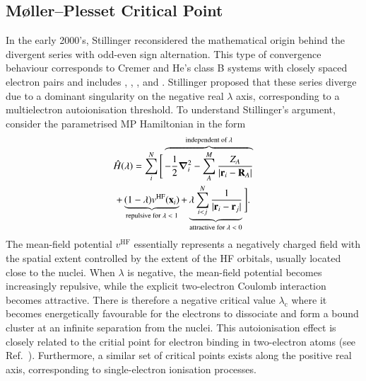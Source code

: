\documentclass[aps,prb,reprint,noshowkeys,linenumbers,superscriptaddress]{revtex4-1}
\newcommand{\Ne}{N} %
\newcommand{\Nn}{M} %
\newcommand{\hH}{\Hat{H}}
\newcommand{\lc}{\lambda_{\text{c}}}
\begin{document}
\subsection{M{\o}ller--Plesset Critical Point}
\label{sec:MP_critical_point}

In the early 2000's, Stillinger reconsidered the mathematical origin behind the divergent series with odd-even
sign alternation.\cite{Stillinger_2000} 
This type of convergence behaviour corresponds to Cremer and He's class B systems with closely spaced
electron pairs and includes , , , and .\cite{Cremer_1996}
Stillinger proposed that these series diverge due to a dominant singularity
on the negative real $\lambda$ axis, corresponding to a multielectron autoionisation threshold.\cite{Stillinger_2000}
To understand Stillinger's argument, consider the parametrised MP Hamiltonian in the form
\begin{multline}
\label{eq:HamiltonianStillinger}
    \hH(\lambda) = 
    \sum_{i}^{\Ne} \Bigg[ 
    \overbrace{-\frac{1}{2}\grad_i^2 
    - \sum_{A}^{\Nn} \frac{Z_A}{\abs{\vb{r}_i-\vb{R}_A}}}^{\text{independent of $\lambda$}}
    \\
    + \underbrace{(1-\lambda)v^{\text{HF}}(\vb{x}_i)}_{\text{repulsive for $\lambda < 1$}}
    + \underbrace{\lambda\sum_{i<j}^{\Ne}\frac{1}{|\vb{r}_i-\vb{r}_j|}}_{\text{attractive for $\lambda < 0$}}
    \Bigg].
\end{multline}
The mean-field potential $v^{\text{HF}}$ essentially represents a negatively charged field with the spatial extent
controlled by the extent of the HF orbitals, usually located close to the nuclei.
When $\lambda$ is negative, the mean-field potential becomes increasingly repulsive, while the explicit two-electron 
Coulomb interaction becomes attractive.
There is therefore a negative critical value $\lc$ where it becomes energetically favourable for the electrons 
to dissociate and form a bound cluster at an infinite separation from the nuclei.\cite{Stillinger_2000}
This autoionisation effect is closely related to the critial point for electron binding in two-electron 
atoms (see Ref.~).
Furthermore, a similar set of critical points exists along the positive real axis, corresponding to single-electron ionisation
processes.\cite{Sergeev_2005}
\end{document}
